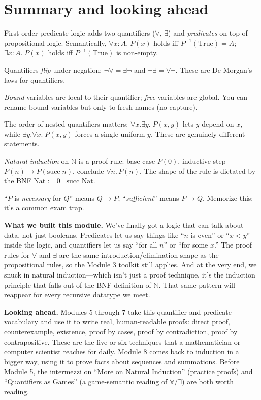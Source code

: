 \documentclass[11pt]{article}
\begin{document}
\section{Summary and looking ahead}

\begin{keytakeaway}
  \item First-order predicate logic adds two quantifiers ($\forall$, $\exists$) and \emph{predicates} on top of propositional logic. Semantically, $\forall x : A.\; P(x)$ holds iff $P^{-1}(\text{True}) = A$; $\exists x : A.\; P(x)$ holds iff $P^{-1}(\text{True})$ is non-empty.
  \item Quantifiers \emph{flip} under negation: $\lnot\forall = \exists\lnot$ and $\lnot\exists = \forall\lnot$. These are De Morgan's laws for quantifiers.
  \item \emph{Bound} variables are local to their quantifier; \emph{free} variables are global. You can rename bound variables but only to fresh names (no capture).
  \item The order of nested quantifiers matters: $\forall x.\exists y.\; P(x,y)$ lets $y$ depend on $x$, while $\exists y.\forall x.\; P(x,y)$ forces a single uniform $y$. These are genuinely different statements.
  \item \emph{Natural induction} on $\mathbb{N}$ is a proof rule: base case $P(0)$, inductive step $P(n) \to P(\text{succ}\;n)$, conclude $\forall n.\, P(n)$. The shape of the rule is dictated by the BNF $\text{Nat} := 0 \mid \text{succ Nat}$.
  \item ``$P$ is \emph{necessary} for $Q$'' means $Q \to P$; ``\emph{sufficient}'' means $P \to Q$. Memorize this; it's a common exam trap.
\end{keytakeaway}

\begin{summarybox}
\textbf{What we built this module.} We've finally got a logic that can talk about data, not just booleans. Predicates let us say things like ``$n$ is even'' or ``$x < y$'' inside the logic, and quantifiers let us say ``for all $n$'' or ``for some $x$.'' The proof rules for $\forall$ and $\exists$ are the same introduction/elimination shape as the propositional rules, so the Module 3 toolkit still applies. And at the very end, we snuck in natural induction---which isn't just a proof technique, it's the induction principle that falls out of the BNF definition of $\mathbb{N}$. That same pattern will reappear for every recursive datatype we meet.

\medskip
\textbf{Looking ahead.} Modules 5 through 7 take this quantifier-and-predicate vocabulary and use it to write real, human-readable proofs: direct proof, counterexample, existence, proof by cases, proof by contradiction, proof by contrapositive. These are the five or six techniques that a mathematician or computer scientist reaches for daily. Module 8 comes back to induction in a bigger way, using it to prove facts about sequences and summations. Before Module 5, the intermezzi on ``More on Natural Induction'' (practice proofs) and ``Quantifiers as Games'' (a game-semantic reading of $\forall$/$\exists$) are both worth reading.
\end{summarybox}
\end{document}

